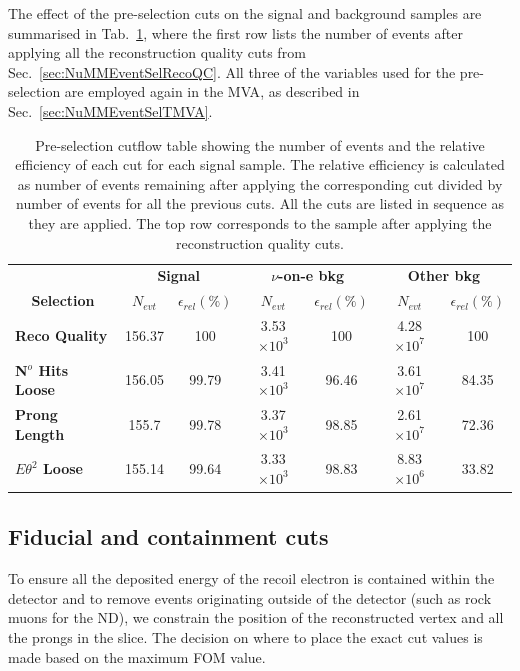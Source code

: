 The effect of the pre-selection cuts on the signal and background samples are summarised in Tab.~\ref{tab:CutflowTableBasicSelection}, where the first row lists the number of events after applying all the reconstruction quality cuts from Sec.~\ref{sec:NuMMEventSelRecoQC}. All three of the variables used for the pre-selection are employed again in the \gls{MVA}, as described in Sec.~\ref{sec:NuMMEventSelTMVA}.


\begin{table}[!hb]
\centering
\caption[Event selection cutflow table for the pre-selection]{Pre-selection cutflow table showing the number of events and the relative efficiency of each cut for each signal sample. The relative efficiency is calculated as number of events remaining after applying the corresponding cut divided by number of events for all the previous cuts. All the cuts are listed in sequence as they are applied. The top row corresponds to the sample after applying the reconstruction quality cuts.}
\begin{tabular}{|l|cc|cc|cc|}\hline
\multicolumn{1}{|c|}{} & \multicolumn{2}{c|}{\textbf{Signal}} & \multicolumn{2}{c|}{\textbf{$\nu$-on-e bkg}} & \multicolumn{2}{c|}{\textbf{Other bkg}} \\
\multicolumn{1}{|c|}{\multirow{-2}{*}{\textbf{Selection}}} & \textbf{$N_{evt}$} & \textbf{$\epsilon_{rel}\left(\%\right)$} & \textbf{$N_{evt}$} & \textbf{$\epsilon_{rel}\left(\%\right)$}  & \textbf{$N_{evt}$} & \textbf{$\epsilon_{rel}\left(\%\right)$}\\\hline
\textbf{Reco Quality} & 156.37 & 100 & 3.53$\times 10^3$ & 100 & 4.28$\times 10^7$ & 100\\
\textbf{N$^o$ Hits Loose} & 156.05 & 99.79 & 3.41$\times 10^3$ & 96.46 & 3.61$\times 10^7$ & 84.35\\
\textbf{Prong Length} & 155.7 & 99.78 & 3.37$\times 10^3$ & 98.85 & 2.61$\times 10^7$ & 72.36\\
\textbf{$E\theta^2$ Loose} & 155.14 & 99.64 & 3.33$\times 10^3$ & 98.83 & 8.83$\times 10^6$ & 33.82\\\hline
\end{tabular}
\label{tab:CutflowTableBasicSelection}
\end{table}

\subsection{Fiducial and containment cuts}\label{sec:NuMMEventSelFidCont}
To ensure all the deposited energy of the recoil electron is contained within the detector and to remove events originating outside of the detector (such as rock muons for the \gls{ND}), we constrain the position of the reconstructed vertex and all the prongs in the slice. The decision on where to place the exact cut values is made based on the maximum \gls{FOM} value.

